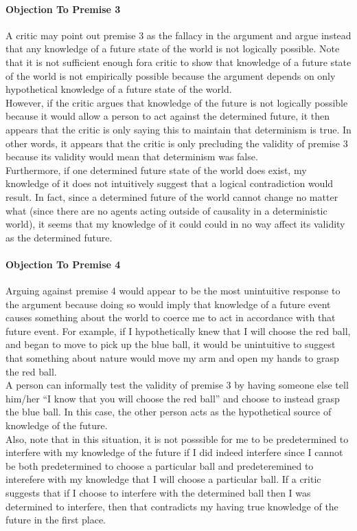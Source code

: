 \documentclass[a4paper, 12pt]{article}
\begin{document}
\paragraph{Objection To Premise 3}
A critic may point out premise 3 as the fallacy in the argument and argue instead that any knowledge of a future state of the world is not logically possible. Note that it is not sufficient enough fora critic to show that knowledge of a future state of the world is not empirically possible because the argument depends on only hypothetical knowledge of a future state of the world. \\
\break
However, if the critic argues that knowledge of the future is not logically possible because it would allow a person to act against the determined future, it then appears that the critic is only saying this to maintain that determinism is true. In other words, it appears that the critic is only precluding the validity of premise 3 because its validity would mean that determinism was false. \\
\break
Furthermore, if one determined future state of the world does exist, my knowledge of it does not intuitively suggest that a logical contradiction would result. In fact, since a determined future of the world cannot change no matter what (since there are no agents acting outside of causality in a deterministic world), it seems that my knowledge of it could could in no way affect its validity as the determined future. \\
\paragraph{Objection To Premise 4}
Arguing against premise 4 would appear to be the most unintuitive response to the argument because doing so would imply that knowledge of a future event causes something about the world to coerce me to act in accordance with that future event. For example, if I hypothetically knew that I will choose the red ball, and began to move to pick up the blue ball, it would be unintuitive to suggest that something about nature would move my arm and open my hands to grasp the red ball. \\
\break
A person can informally test the validity of premise 3 by having someone else tell him/her ``I know that you will choose the red ball'' and choose to instead grasp the blue ball. In this case, the other person acts as the hypothetical source of knowledge of the future. \\
\break
Also, note that in this situation, it is not posssible for me to be predetermined to interfere with my knowledge of the future if I did indeed interfere since I cannot be both predetermined to choose a particular ball and predeteremined to interefere with my knowledge that I will choose a particular ball. If a critic suggests that if I choose to interfere with the determined ball then I was determined to interfere, then that contradicts my having true knowledge of the future in the first place. \\
\end{document}
